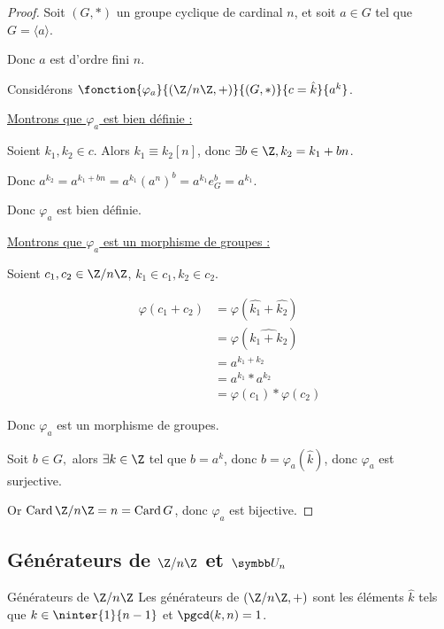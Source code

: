 \begin{proof}
    Soit $(G, \ast)$ un groupe cyclique de cardinal $n$, et soit $a \in G$ tel que $G = \langle a \rangle$.

    Donc $a$ est d'ordre fini $n$.

    Considérons $\fonction{\varphi_a}{(\Z/n\Z, +)}{(G, \ast)}{c = \hat k}{a^k}$.

    \uline{Montrons que $\varphi_a$ est bien définie :}

    \svspace Soient $k_1, k_2 \in c$. Alors $k_1 \equiv k_2 [n]$, donc $\exists b \in \Z, k_2 = k_1 + bn$.
    
    Donc $a^{k_2} = a^{k_1 + bn} = a^{k_1} (a^n)^b = a^{k_1} e_G^b = a^{k_1}$.

    Donc $\varphi_a$ est bien définie.

    \uline{Montrons que $\varphi_a$ est un morphisme de groupes :}

    \svspace Soient $c_1, c_2 \in \Z/n\Z$, $k_1 \in c_1, k_2 \in c_2$.

    \begin{align*}
        \varphi(c_1 + c_2) & = \varphi(\hat{k_1} + \hat{k_2}) \\
        & = \varphi(\widehat{k_1 + k_2}) \\
        & = a^{k_1 + k_2} \\
        & = a^{k_1} \ast a^{k_2} \\
        & = \varphi(c_1) \ast \varphi(c_2)
    \end{align*}

    Donc $\varphi_a$ est un morphisme de groupes.

    Soit $b \in G, $ alors $\exists k \in \Z$ tel que $b = a^k$, donc $b = \varphi_a(\hat k)$, donc $\varphi_a$ est surjective.

    Or $\operatorname{Card} \Z/n\Z = n = \operatorname{Card} G$, donc $\varphi_a$ est bijective.
\end{proof}

\subsection{Générateurs de \texorpdfstring{$\Z / n \Z$}{Z/nZ} et \texorpdfstring{$\symbb U_n$}{Un}}

\begin{theoreme}{Générateurs de $\Z/n\Z$}{}
    Les générateurs de $(\Z/n\Z, +)$ sont les éléments $\hat k$ tels que 
    $k \in \ninter{1}{n-1}$ et $\pgcd(k, n) = 1$.
\end{theoreme}

